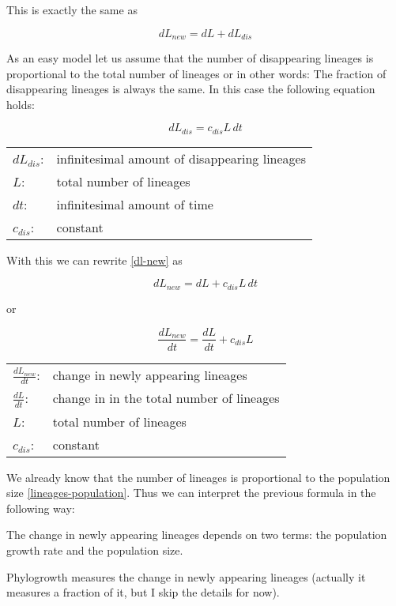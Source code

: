 This is exactly the same as

\begin{equation}
dL_{new} = dL + dL_{dis} \label{dl-new}
\end{equation}

As an easy model let us assume that the number of disappearing
lineages is proportional to the total number of lineages or
in other words: The fraction of disappearing lineages is always
the same. In this case the following equation holds:

\begin{equation}
dL_{dis} = c_{dis}L\,dt
\end{equation}

\begin{tabular}{ll}
$dL_{dis}$: & infinitesimal amount of disappearing lineages\\
$L$:       & total number of lineages\\
$dt$:      & infinitesimal amount of time\\
$c_{dis}$: & constant
\end{tabular}
\vspace{1em}

With this we can rewrite \ref{dl-new} as

\begin{equation}
dL_{new} = dL + c_{dis}L\,dt
\end{equation}

or

\begin{equation}
\frac{dL_{new}}{dt} = \frac{dL}{dt} + c_{dis}L \label{dl-new-change}
\end{equation}

\begin{tabular}{ll}
$\frac{dL_{new}}{dt}$: & change in newly appearing lineages\\
$\frac{dL}{dt}$:       & change in in the total number of lineages\\
$L$:                   & total number of lineages\\
$c_{dis}$:             & constant
\end{tabular}
\vspace{1em}

We already know that the number of lineages is proportional to
the population size \ref{lineages-population}. Thus we can
interpret the previous formula in the following way:

The change in newly appearing lineages depends on two terms:
the population growth rate and the population size.

Phylogrowth measures the change in newly appearing lineages
(actually it measures a fraction of it, but I skip the details
for now).











